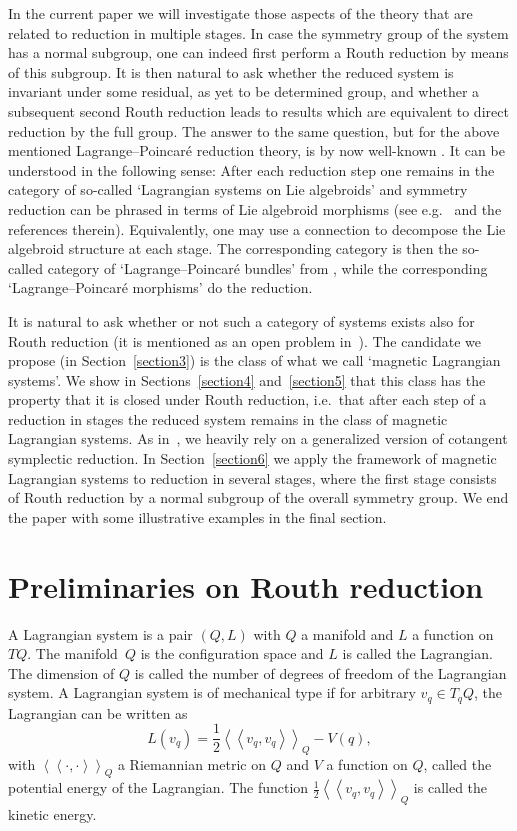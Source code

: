 \documentclass[pdftex]{sigma}
\renewcommand{\ll}{\left<\!\left<}
\renewcommand{\gg}{\right>\!\right>}
\begin{document}
In the current paper we will investigate those aspects
of the theory that are related to reduction in multiple stages. In
case the symmetry group of the system has a normal subgroup, one can
indeed f\/irst perform a Routh reduction by means of this subgroup.
It is then natural to ask whether the reduced system is invariant
under some residual, as yet to be determined group, and whether a
subsequent second Routh reduction leads to results which are
equivalent to direct reduction by the full group. The answer to the same question, but for the above mentioned Lagrange--Poincar\'e
reduction theory, is by now well-known \cite{CMR01}.  It can be understood in the following sense: After each reduction step
one remains in the category of so-called `Lagrangian systems on Lie
algebroids'  and symmetry reduction can be phrased in terms of Lie
algebroid morphisms (see e.g.~\cite{survey} and the references therein). Equivalently, one may use a connection to decompose the Lie algebroid structure at each stage. The corresponding category is then the so-called category of
`Lagrange--Poincar\'e  bundles' from \cite{CMR01}, while the corresponding `Lagrange--Poincar\'e morphisms' do the reduction.

It is natural to ask whether or not such a
category of systems exists also for Routh reduction (it is mentioned as an open problem in~\cite{MarsdenHamRed}).  The candidate we propose (in Section~\ref{section3}) is the class of what we call `magnetic Lagrangian systems'. We show in Sections~\ref{section4} and~\ref{section5} that this
class has the property that it is closed under Routh reduction, i.e.\ that after each step
of a reduction in stages the reduced system remains in the class of magnetic Lagrangian
systems. As in~\cite{BC}, we heavily rely on a generalized version of cotangent symplectic reduction. In Section~\ref{section6} we apply the framework of magnetic Lagrangian systems to reduction in several stages, where the f\/irst stage consists of Routh reduction by a normal subgroup of the overall symmetry group. We end the paper with some illustrative examples in the f\/inal section.


\section{Preliminaries on Routh reduction}\label{section2}

\begin{definition} A Lagrangian system is a pair $(Q,L)$ with $Q$ a manifold and $L$ a function on~$TQ$. The manifold~$Q$ is the conf\/iguration space and $L$ is called the Lagrangian. The dimension of $Q$ is called the number of degrees of freedom of the Lagrangian system.  A Lagrangian system is of mechanical type if for arbitrary $v_q\in T_qQ$, the Lagrangian can be written as \[L(v_q) = \frac12 \ll v_q,v_q\gg_Q-V(q),\] with $\ll\cdot,\cdot\gg_Q$ a Riemannian metric on $Q$ and $V$ a function on $Q$, called the potential energy of the Lagrangian. The function $\frac12\ll v_q,v_q\gg_Q$ is called the kinetic energy.
\end{definition}
\end{document}
